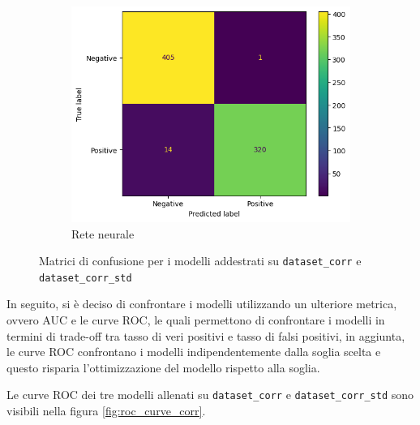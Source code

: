 \begin{figure}[!ht]
\begin{subfigure}{.45\textwidth}
    \end{subfigure}
    \hfill
    \begin{subfigure}{.45\textwidth}
        \centering
        \includegraphics[width=\textwidth]{img/rete/matrice_confusione.png}
        \caption{Rete neurale}
        \label{fig:matrice_di_confusione_per_NN_corr}
    \end{subfigure}
    \caption{Matrici di confusione per i modelli addestrati su \texttt{dataset\_corr} e \texttt{dataset\_corr\_std}}
    \label{fig:matrice_di_confusione_per_corr}
\end{figure}

In seguito, si è deciso di confrontare i modelli utilizzando un ulteriore metrica,
ovvero AUC e le curve ROC, le quali permettono di confrontare i modelli in termini 
di trade-off tra tasso di veri positivi e tasso di falsi positivi, in aggiunta,
le curve ROC confrontano i modelli indipendentemente dalla soglia scelta e questo
risparia l'ottimizzazione del modello rispetto alla soglia.

Le curve ROC dei tre modelli allenati su \texttt{dataset\_corr} e \texttt{dataset\_corr\_std}
sono visibili nella figura \ref{fig:roc_curve_corr}.

